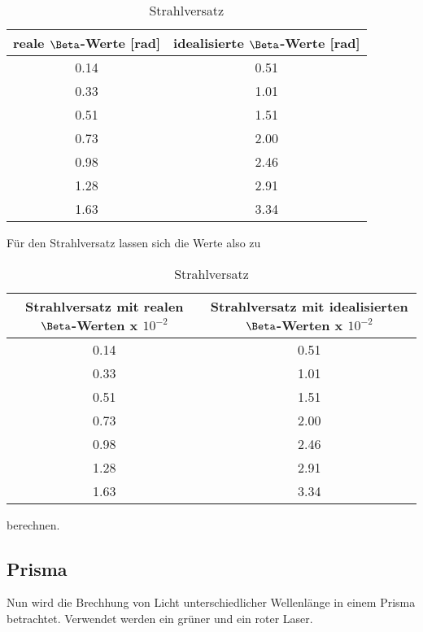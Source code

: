   \begin{table}[H]
    \centering
    \caption{Strahlversatz}
    \begin{tabular}{c c }
      \toprule
      reale $\Beta$-Werte [rad] &  idealisierte $\Beta$-Werte [rad]\\
      \midrule
        0.14 & 0.51 \\
        0.33 & 1.01 \\
        0.51 & 1.51   \\
        0.73 & 2.00   \\
        0.98 & 2.46 \\
        1.28 & 2.91   \\
        1.63 & 3.34 \\
      \bottomrule
    \end{tabular}
  \end{table}
  \noindent Für den Strahlversatz lassen sich die Werte also zu
  \begin{table}[H]
    \centering
    \caption{Strahlversatz}
    \begin{tabular}{c c }
      \toprule
      Strahlversatz mit realen $\Beta$-Werten x $10^{-2}$ & Strahlversatz mit idealisierten $\Beta$-Werten x $10^{-2}$\\
      \midrule
        0.14 & 0.51 \\
        0.33 & 1.01 \\
        0.51 & 1.51   \\
        0.73 & 2.00   \\
        0.98 & 2.46 \\
        1.28 & 2.91   \\
        1.63 & 3.34 \\
      \bottomrule
    \end{tabular}
  \end{table}
  berechnen.

\subsection{Prisma}
  Nun wird die Brechhung von Licht unterschiedlicher Wellenlänge in einem Prisma betrachtet.
  Verwendet werden ein grüner und ein roter Laser. 